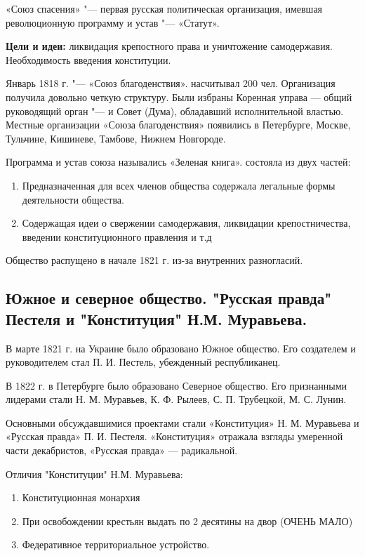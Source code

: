 «Союз спасения» "--- первая русская политическая организация, имевшая революционную программу и устав "--- «Статут».

\textbf{Цели и идеи:} ликвидация крепостного права и уничтожение самодержавия. Необходимость введения конституции.

Январь 1818 г. "--- «Союз благоденствия». насчитывал 200 чел. Организация получила довольно четкую структуру. Были избраны Коренная управа — общий руководящий орган "--- и Совет (Дума), обладавший исполнительной властью. Местные организации «Союза благоденствия» появились в Петербурге, Москве, Тульчине, Кишиневе, Тамбове, Нижнем Новгороде. 

Программа и устав союза назывались «Зеленая книга». состояла из двух частей:

\begin{enumerate}
    \item{Предназначенная для всех членов общества содержала легальные формы деятельности общества.}
    \item{Содержащая идеи о свержении самодержавия, ликвидации крепостничества, введении конституционного правления и т.д}
\end{enumerate}

Общество распущено в начале 1821 г. из-за внутренних разногласий.

\subsection{Южное и северное общество. "Русская правда" Пестеля и "Конституция" Н.М. Муравьева.}

В марте 1821 г. на Украине было образовано Южное общество. Его создателем и руководителем стал П. И. Пестель, убежденный республиканец. 

В 1822 г. в Петербурге было образовано Северное общество. Его признанными лидерами стали Н. М. Муравьев, К. Ф. Рылеев, С. П. Трубецкой, М. С. Лунин.

Основными обсуждавшимися проектами стали «Конституция» Н. М. Муравьева и «Русская правда» П. И. Пестеля. «Конституция» отражала взгляды умеренной части декабристов, «Русская правда» — радикальной.

Отличия "Конституции" Н.М. Муравьева:

\begin{enumerate}
    \item{Конституционная монархия}
    \item{При освобождении крестьян выдать по 2 десятины на двор (ОЧЕНЬ МАЛО)}
    \item{Федеративное территориальное устройство.}
\end{enumerate}

